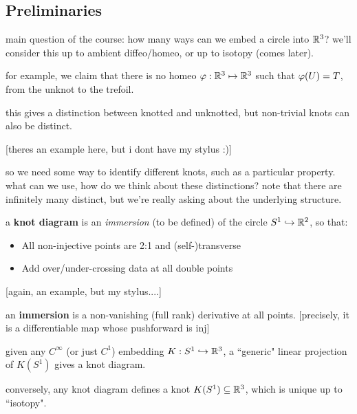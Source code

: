 
\subsection{Preliminaries}

main question of the course: how many ways can we embed a circle into $\mathbb{R}^{3}$?
we'll consider this up to ambient diffeo/homeo, or up to isotopy (comes later).

for example, we claim that there is no homeo $\varphi:\mathbb{R}^{3}\mapsto\mathbb{R}^{3}$ such
that $\varphi(U)=T$, from the unknot to the trefoil.

this gives a distinction between knotted and unknotted, but non-trivial knots
can also be distinct.

[theres an example here, but i dont have my stylus :)]

so we need some way to identify different knots, such as a particular property.
what can we use, how do we think about these distinctions?
note that there are infinitely many distinct, but we're really asking about the
underlying structure.

\begin{defn}
    a \textbf{knot diagram} is an \textit{immersion} (to be defined) of the
    circle $S^{1}\hookrightarrow\mathbb{R}^{2}$, so that:
    \begin{itemize}
        \item All non-injective points are 2:1 and (self-)transverse
        \item Add over/under-crossing data at all double points
    \end{itemize}
\end{defn}

[again, an example, but my stylus....]

\begin{defn}
    an \textbf{immersion} is a non-vanishing (full rank) derivative at all
    points. [precisely, it is a differentiable map whose pushforward is inj]
\end{defn}

\begin{prop}
    given any $C^{\infty}$ (or just $C^{1}$) embedding $K:S^{1}\hookrightarrow\mathbb{R}^{3}$,
    a ``generic" linear projection of $K(S^{1})$ gives a knot diagram.

    conversely, any knot diagram defines a knot $K(S^{1})\subseteq\mathbb{R}^{3}$,
    which is unique up to ``isotopy".
\end{prop}


